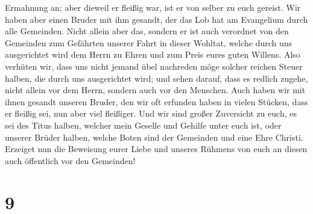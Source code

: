 Ermahnung an; aber dieweil er fleißig war, ist er von selber zu euch
gereist.  Wir haben aber einen Bruder mit ihm gesandt,
der das Lob hat am Evangelium durch alle Gemeinden. 
Nicht allein aber das, sondern er ist auch verordnet von den Gemeinden
zum Gefährten unserer Fahrt in dieser Wohltat, welche durch uns
ausgerichtet wird dem Herrn zu Ehren und zum Preis eures guten Willens.
 Also verhüten wir, dass uns nicht jemand übel nachreden
möge solcher reichen Steuer halben, die durch uns ausgerichtet wird;
 und sehen darauf, dass es redlich zugehe, nicht allein
vor dem Herrn, sondern auch vor den Menschen.  Auch haben
wir mit ihnen gesandt unseren Bruder, den wir oft erfunden haben in
vielen Stücken, dass er fleißig sei, nun aber viel fleißiger.
 Und wir sind großer Zuversicht zu euch, es sei des Titus
halben, welcher mein Geselle und Gehilfe unter euch ist, oder unserer
Brüder halben, welche Boten sind der Gemeinden und eine Ehre Christi.
 Erzeiget nun die Beweisung eurer Liebe und unseres
Rühmens von euch an diesen auch öffentlich vor den Gemeinden!

\hypertarget{section-8}{%
\section{9}\label{section-8}}

